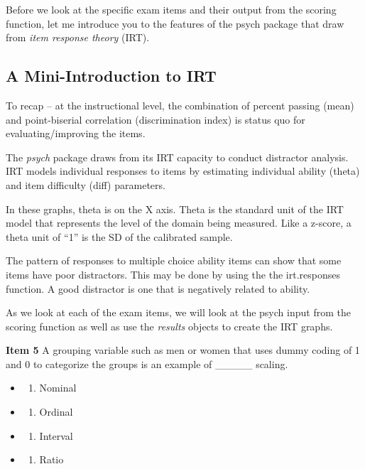 \documentclass[
  english,
]{book}
\providecommand{\tightlist}{%
  \setlength{\itemsep}{0pt}\setlength{\parskip}{0pt}}
\begin{document}
Before we look at the specific exam items and their output from the scoring function, let me introduce you to the features of the psych package that draw from \emph{item response theory} (IRT).

\hypertarget{a-mini-introduction-to-irt}{%
\subsection{A Mini-Introduction to IRT}\label{a-mini-introduction-to-irt}}

To recap -- at the instructional level, the combination of percent passing (mean) and point-biserial correlation (discrimination index) is status quo for evaluating/improving the items.

The \emph{psych} package draws from its IRT capacity to conduct distractor analysis. IRT models individual responses to items by estimating individual ability (theta) and item difficulty (diff) parameters.

In these graphs, theta is on the X axis. Theta is the standard unit of the IRT model that represents the level of the domain being measured. Like a z-score, a theta unit of ``1'' is the SD of the calibrated sample.

The pattern of responses to multiple choice ability items can show that some items have poor distractors. This may be done by using the the irt.responses function. A good distractor is one that is negatively related to ability.

As we look at each of the exam items, we will look at the psych input from the scoring function as well as use the \emph{results} objects to create the IRT graphs.

\textbf{Item 5} A grouping variable such as men or women that uses dummy coding of 1 and 0 to categorize the groups is an example of \_\_\_\_\_ scaling.

\begin{itemize}
\item
  \begin{enumerate}
  \def\labelenumi{\alph{enumi})}
  \tightlist
  \item
    Nominal
  \end{enumerate}
\item
  \begin{enumerate}
  \def\labelenumi{\alph{enumi})}
  \setcounter{enumi}{1}
  \tightlist
  \item
    Ordinal
  \end{enumerate}
\item
  \begin{enumerate}
  \def\labelenumi{\alph{enumi})}
  \setcounter{enumi}{2}
  \tightlist
  \item
    Interval
  \end{enumerate}
\item
  \begin{enumerate}
  \def\labelenumi{\alph{enumi})}
  \setcounter{enumi}{3}
  \tightlist
  \item
    Ratio
  \end{enumerate}
\end{itemize}
\end{document}
